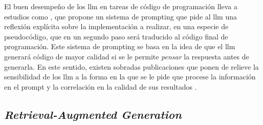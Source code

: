 El buen desempeño de los \gls{llm} en tareas de código de programación lleva a estudios como \cite{liStructuredChainofThoughtPrompting2023}, que propone un sistema de prompting que pide al \gls{llm} una reflexión explícita sobre la implementación a realizar, en una especie de pseudocódigo, que en un segundo paso será traducido al código final de programación. Este sistema de prompting se basa en la idea de que el \gls{llm} generará código de mayor calidad si se le permite \emph{pensar} la respuesta antes de generarla. En este sentido, existen sobradas publicaciones que ponen de relieve la sensibilidad de los \gls{llm} a la forma en la que se le pide que procese la información en el prompt y la correlación en la calidad de sus resultados \citep{zhouLeasttoMostPromptingEnables2023,weiChainofThoughtPromptingElicits2023,LLMPromptingGuide}.
 
\subsection{\emph{Retrieval-Augmented Generation}}
\label{sec:rag}

